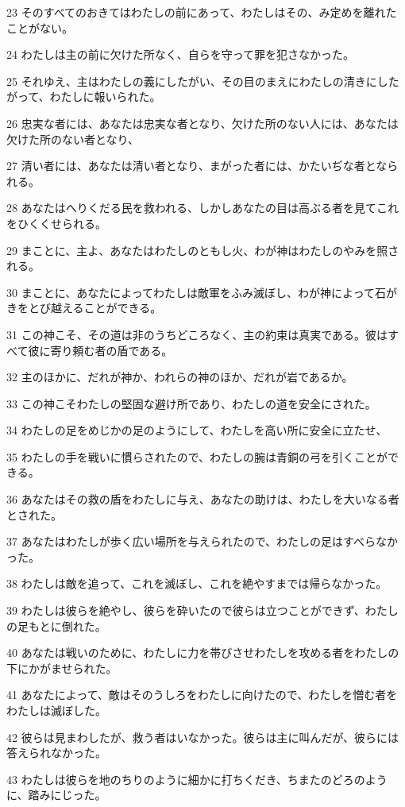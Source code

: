 \par 23 そのすべてのおきてはわたしの前にあって、わたしはその、み定めを離れたことがない。
\par 24 わたしは主の前に欠けた所なく、自らを守って罪を犯さなかった。
\par 25 それゆえ、主はわたしの義にしたがい、その目のまえにわたしの清きにしたがって、わたしに報いられた。
\par 26 忠実な者には、あなたは忠実な者となり、欠けた所のない人には、あなたは欠けた所のない者となり、
\par 27 清い者には、あなたは清い者となり、まがった者には、かたいぢな者となられる。
\par 28 あなたはへりくだる民を救われる、しかしあなたの目は高ぶる者を見てこれをひくくせられる。
\par 29 まことに、主よ、あなたはわたしのともし火、わが神はわたしのやみを照される。
\par 30 まことに、あなたによってわたしは敵軍をふみ滅ぼし、わが神によって石がきをとび越えることができる。
\par 31 この神こそ、その道は非のうちどころなく、主の約束は真実である。彼はすべて彼に寄り頼む者の盾である。
\par 32 主のほかに、だれが神か、われらの神のほか、だれが岩であるか。
\par 33 この神こそわたしの堅固な避け所であり、わたしの道を安全にされた。
\par 34 わたしの足をめじかの足のようにして、わたしを高い所に安全に立たせ、
\par 35 わたしの手を戦いに慣らされたので、わたしの腕は青銅の弓を引くことができる。
\par 36 あなたはその救の盾をわたしに与え、あなたの助けは、わたしを大いなる者とされた。
\par 37 あなたはわたしが歩く広い場所を与えられたので、わたしの足はすべらなかった。
\par 38 わたしは敵を追って、これを滅ぼし、これを絶やすまでは帰らなかった。
\par 39 わたしは彼らを絶やし、彼らを砕いたので彼らは立つことができず、わたしの足もとに倒れた。
\par 40 あなたは戦いのために、わたしに力を帯びさせわたしを攻める者をわたしの下にかがませられた。
\par 41 あなたによって、敵はそのうしろをわたしに向けたので、わたしを憎む者をわたしは滅ぼした。
\par 42 彼らは見まわしたが、救う者はいなかった。彼らは主に叫んだが、彼らには答えられなかった。
\par 43 わたしは彼らを地のちりのように細かに打ちくだき、ちまたのどろのように、踏みにじった。
